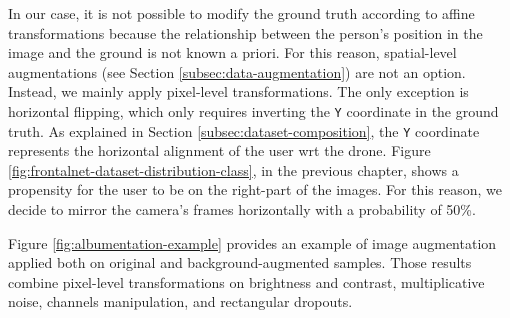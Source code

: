 \medskip

In our case, it is not possible to modify the ground truth according to affine transformations because the relationship between the person's position in the image and the ground is not known a priori. For this reason, spatial-level augmentations (see Section \ref{subsec:data-augmentation}) are not an option. Instead, we mainly apply pixel-level transformations. The only exception is horizontal flipping, which only requires inverting the \texttt{Y} coordinate in the ground truth. As explained in Section \ref{subsec:dataset-composition}, the \texttt{Y} coordinate represents the horizontal alignment of the user \gls{wrt} the drone. Figure \ref{fig:frontalnet-dataset-distribution-class}, in the previous chapter, shows a propensity for the user to be on the right-part of the images. For this reason, we decide to mirror the camera's frames horizontally with a probability of 50\%.

Figure \ref{fig:albumentation-example} provides an example of image augmentation applied both on original and background-augmented samples. Those results combine pixel-level transformations on brightness and contrast, multiplicative noise, channels manipulation, and rectangular dropouts.

